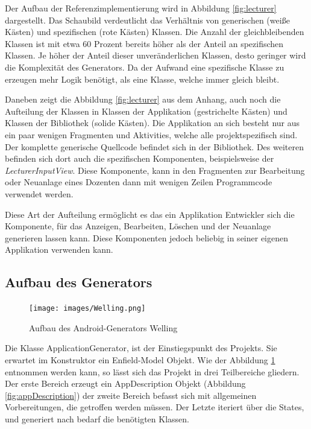 Der Aufbau der Referenzimplementierung wird in Abbildung \ref{fig:lecturer} dargestellt. Das Schaubild verdeutlicht das Verhältnis von generischen (weiße Kästen) und spezifischen (rote Kästen) Klassen. Die Anzahl der gleichbleibenden Klassen ist mit etwa 60 Prozent bereits höher als der Anteil an spezifischen Klassen. Je höher der Anteil dieser unveränderlichen Klassen, desto geringer wird die Komplexität des Generators. Da der Aufwand eine spezifische Klasse zu erzeugen mehr Logik benötigt, als eine Klasse, welche immer gleich bleibt.

Daneben zeigt die Abbildung \ref{fig:lecturer} aus dem Anhang, auch noch die Aufteilung der Klassen in Klassen der Applikation (gestrichelte Kästen) und Klassen der Bibliothek (solide Kästen). Die Applikation an sich besteht nur aus ein paar wenigen Fragmenten und Aktivities, welche alle projektspezifisch sind. Der komplette generische Quellcode befindet sich in der Bibliothek. Des weiteren befinden sich dort auch die spezifischen Komponenten, beispielsweise der \textit{LecturerInputView}. Diese Komponente, kann in den Fragmenten zur Bearbeitung oder Neuanlage eines Dozenten dann mit wenigen Zeilen Programmcode verwendet werden.

Diese Art der Aufteilung ermöglicht es das ein Applikation Entwickler sich die Komponente, für das Anzeigen, Bearbeiten, Löschen und der Neuanlage generieren lassen kann. Diese Komponenten jedoch beliebig in seiner eigenen Applikation verwenden kann.

\subsection{Aufbau des Generators}

\begin{figure}[H]
	\begin{center}
		\texttt{[image: images/Welling.png]}
		\caption{Aufbau des Android-Generators Welling}
		\label{fig:welling}
	\end{center}
\end{figure}


Die Klasse ApplicationGenerator, ist der Einstiegspunkt des Projekts. Sie erwartet im Konstruktor ein Enfield-Model Objekt. Wie der Abbildung \ref{fig:welling} entnommen werden kann, so lässt sich das Projekt in drei Teilbereiche gliedern. Der erste Bereich erzeugt ein AppDescription Objekt (Abbildung \ref{fig:appDescription}) der zweite Bereich befasst sich mit allgemeinen Vorbereitungen, die getroffen werden müssen. Der Letzte iteriert über die States, und generiert nach bedarf die benötigten Klassen.

